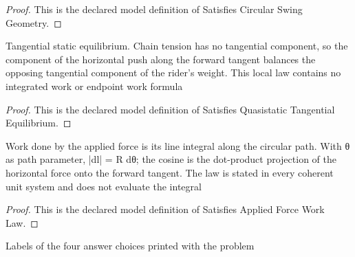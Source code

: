 \begin{proof}
  This is the declared model definition of Satisfies Circular Swing Geometry.
\end{proof}
\begin{definition}
  \label{def:physics:phyx-mini-0809:phyxminiproblems-problemphyxmini0809-satisfiesquasistatictangentialequilibrium}
  Tangential static equilibrium. Chain tension has no tangential component, so the component of the horizontal push along the forward tangent balances the opposing tangential component of the rider's weight. This local law contains no integrated work or endpoint work formula
\end{definition}
\begin{proof}
  This is the declared model definition of Satisfies Quasistatic Tangential Equilibrium.
\end{proof}
\begin{definition}
  \label{def:physics:phyx-mini-0809:phyxminiproblems-problemphyxmini0809-satisfiesappliedforceworklaw}
  Work done by the applied force is its line integral along the circular path. With θ as path parameter, |d⃗l| = R dθ; the cosine is the dot-product projection of the horizontal force onto the forward tangent. The law is stated in every coherent unit system and does not evaluate the integral
\end{definition}
\begin{proof}
  This is the declared model definition of Satisfies Applied Force Work Law.
\end{proof}
\begin{definition}
  \label{def:physics:phyx-mini-0809:phyxminiproblems-problemphyxmini0809-answerchoice}
  Labels of the four answer choices printed with the problem
\end{definition}
